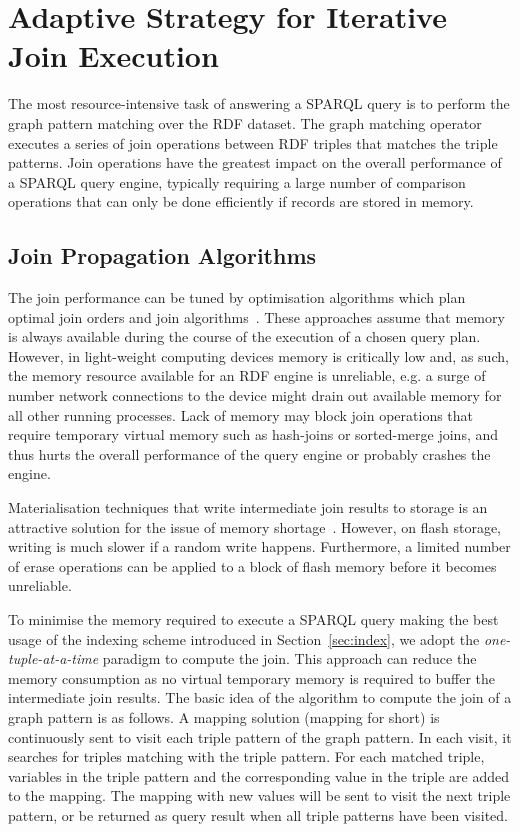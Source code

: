 \chapter{Adaptive Strategy for Iterative Join Execution}
\label{sec:adapt}

The most resource-intensive task of answering a SPARQL query is to perform the graph pattern matching over the RDF dataset. 
The graph matching operator executes a series of join operations between RDF triples that matches the triple patterns. Join operations have the greatest impact on the overall performance of a SPARQL query engine, typically requiring a large number of comparison operations that can only be done efficiently if records are stored in memory. 

\section{Join Propagation Algorithms}

The join performance can be tuned by optimisation algorithms which plan optimal join orders and join algorithms~\cite{Stocker:2008,Neumann:2008,Tsialiamanis:2012}. 
These approaches assume that memory is always available during the course of the execution of a chosen query plan. However, in  light-weight computing devices memory is critically low and, as such, the memory resource available for an RDF engine is unreliable, e.g. a surge of number network connections to the device might drain out available memory for all other running processes. Lack of memory may block  join operations that require temporary virtual memory such as hash-joins or sorted-merge joins,  and thus hurts the overall performance of the query engine or probably crashes the engine.

Materialisation techniques that write intermediate join results to storage is an attractive solution for the issue of  memory shortage~\cite{Garcia-Molina:2008}. However, on flash storage, writing is much slower if a random write happens. Furthermore, a limited number of erase operations can be applied to a block of flash memory before it becomes unreliable. 

To minimise the memory required  to execute a SPARQL query making the best usage of the indexing scheme introduced in Section~\ref{sec:index}, we adopt the \textit{one-tuple-at-a-time} paradigm to compute the join. This approach can reduce the memory consumption as no virtual temporary memory is required to buffer the intermediate join results. 
The basic idea of the algorithm to compute the join of a graph pattern is as follows.
A mapping solution (mapping for short) is continuously sent to visit each triple pattern of the graph pattern.
In each visit, it searches for triples matching with the triple pattern.
For each matched triple, variables in the triple pattern and the corresponding value in the triple are added to the mapping.
The mapping with new values will be sent to visit the next triple pattern, or be returned as query result when all triple patterns have been visited.

